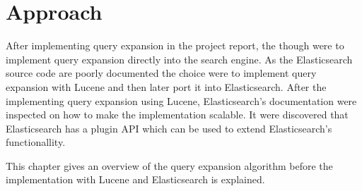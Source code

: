 \chapter{Approach}
\label{ch:approach}
After implementing query expansion in the project report,
the though were to implement query expansion directly into the search engine.
As the Elasticsearch source code are poorly documented the choice were to implement query expansion with Lucene and then later port it into Elasticsearch.
After the implementing query expansion using Lucene,
Elasticsearch's documentation were inspected on how to make the implementation scalable.
It were discovered that Elasticsearch has a plugin API which can be used to extend Elasticsearch's functionallity.

This chapter gives an overview of the query expansion algorithm before the implementation with Lucene and Elasticsearch is explained.



